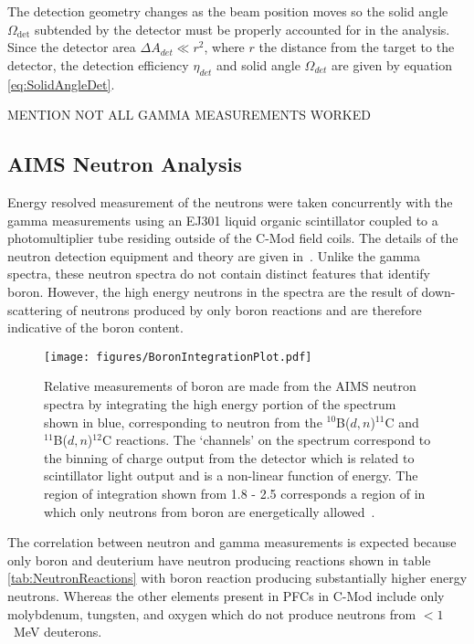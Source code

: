 \documentclass[final,3p,times,twocolumn]{elsarticle}
\begin{document}
The detection geometry changes as the beam position moves so the solid angle $\Omega_\mathrm{det}$ subtended by the detector must be properly accounted for in the analysis. Since the detector area $\Delta A_{det} \ll r^2$, where $r$ the distance from the target to the detector, the detection efficiency $\eta_{det}$ and solid angle $\Omega_{det}$ are given by equation \ref{eq:SolidAngleDet}.

MENTION NOT ALL GAMMA MEASUREMENTS WORKED

\subsection{AIMS Neutron Analysis}

Energy resolved measurement of the neutrons were taken concurrently with the gamma measurements using an EJ301 liquid organic scintillator coupled to a photomultiplier tube residing outside of the C-Mod field coils.  The details of the neutron detection equipment and theory are given in~\cite{HartwigThesis}.  Unlike the gamma spectra, these neutron spectra do not contain distinct features that identify boron. However, the high energy neutrons in the spectra are the result of down-scattering of neutrons produced by only boron reactions and are therefore indicative of the boron content. 

\begin{figure}[h!]
 \centering
  \texttt{[image: figures/BoronIntegrationPlot.pdf]}
 \caption{Relative measurements of boron are made from the AIMS neutron spectra by integrating the high energy portion of the spectrum shown in blue, corresponding to neutron from the $^{10}$B($d,n$)$^{11}$C and $^{11}$B($d,n$)$^{12}$C reactions.  The `channels' on the spectrum correspond to the binning of charge output from the detector which is related to scintillator light output and is a non-linear function of energy.  The region of integration shown from 1.8 - 2.5 corresponds a region of in which only neutrons from boron are energetically allowed~\cite{HartwigThesis}.}
 \label{fig:BoronNeutronSpectrum}
\end{figure}

The correlation between neutron and gamma measurements is expected because only boron and deuterium have neutron producing reactions shown in table \ref{tab:NeutronReactions} with boron reaction producing substantially higher energy neutrons. Whereas the other elements present in PFCs in C-Mod include only molybdenum, tungsten, and oxygen which do not produce neutrons from $< 1$~MeV deuterons.
\end{document}
